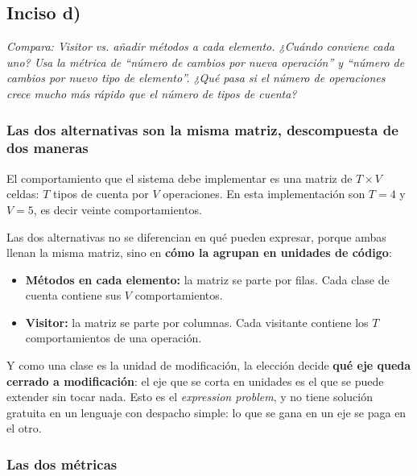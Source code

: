 {}
\subsection*{Inciso d)}

\sloppy

\textit{Compara: Visitor vs. añadir métodos a cada elemento. ¿Cuándo conviene cada uno? Usa la
métrica de ``número de cambios por nueva operación'' y ``número de cambios por nuevo tipo de
elemento''. ¿Qué pasa si el número de operaciones crece mucho más rápido que el número de
tipos de cuenta?}

\vspace{0.4cm}

\subsubsection*{Las dos alternativas son la misma matriz, descompuesta de dos maneras}

El comportamiento que el sistema debe implementar es una matriz de $T \times V$ celdas: $T$
tipos de cuenta por $V$ operaciones. En esta implementación son $T = 4$ y $V = 5$, es decir
veinte comportamientos.

Las dos alternativas no se diferencian en qué pueden expresar, porque ambas llenan la misma
matriz, sino en \textbf{cómo la agrupan en unidades de código}:

\begin{itemize}[leftmargin=1.2cm]
    \item \textbf{Métodos en cada elemento:} la matriz se parte por filas. Cada clase de
          cuenta contiene sus $V$ comportamientos.
    \item \textbf{Visitor:} la matriz se parte por columnas. Cada visitante contiene los $T$
          comportamientos de una operación.
\end{itemize}

Y como una clase es la unidad de modificación, la elección decide \textbf{qué eje queda
cerrado a modificación}: el eje que se corta en unidades es el que se puede extender sin
tocar nada. Esto es el \textit{expression problem}, y no tiene solución gratuita en un
lenguaje con despacho simple: lo que se gana en un eje se paga en el otro.

\subsubsection*{Las dos métricas}

